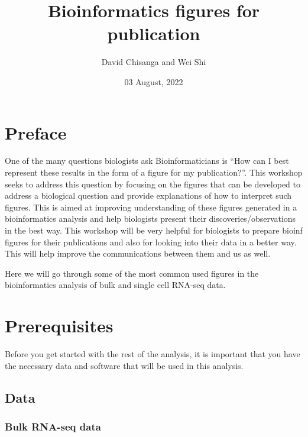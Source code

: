 \documentclass[
  openany]{book}
\title{Bioinformatics figures for publication}
\author{David Chisanga and Wei Shi}
\date{03 August, 2022}
\begin{document}
\maketitle

{
\setcounter{tocdepth}{1}
\tableofcontents
}
\hypertarget{preface}{%
\chapter{Preface}\label{preface}}

One of the many questions biologists ask Bioinformaticians is ``How can I best represent these results in the form of a figure for my publication?''. This workshop seeks to address this question by focusing on the figures that can be developed to address a biological question and provide explanations of how to interpret such figures. This is aimed at improving understanding of these figures generated in a bioinformatics analysis and help biologists present their discoveries/observations in the best way. This workshop will be very helpful for biologists to prepare bioinf figures for their publications and also for looking into their data in a better way. This will help improve the communications between them and us as well.

Here we will go through some of the most common used figures in the bioinformatics analysis of bulk and single cell RNA-seq data.

\vspace{-100pt}

\vspace{-100pt}

\hypertarget{prerequisites}{%
\chapter{Prerequisites}\label{prerequisites}}

Before you get started with the rest of the analysis, it is important that you have the necessary data and software that will be used in this analysis.

\hypertarget{prereq}{%
\section{Data}\label{prereq}}

\hypertarget{bulk-rna-seq-data}{%
\subsection{Bulk RNA-seq data}\label{bulk-rna-seq-data}}
\end{document}
